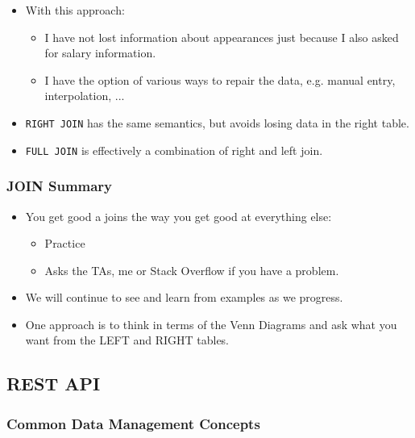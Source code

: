 \documentclass[11pt]{article}
\providecommand{\tightlist}{%
      \setlength{\itemsep}{0pt}\setlength{\parskip}{0pt}}
\begin{document}
    \begin{itemize}
\item
  With this approach:

  \begin{itemize}
  \tightlist
  \item
    I have not lost information about appearances just because I also
    asked for salary information.
  \item
    I have the option of various ways to repair the data, e.g. manual
    entry, interpolation, ...
  \end{itemize}
\item
  \texttt{RIGHT\ JOIN} has the same semantics, but avoids losing data in
  the right table.
\item
  \texttt{FULL\ JOIN} is effectively a combination of right and left
  join.
\end{itemize}

    \subsubsection{JOIN Summary}\label{join-summary}

\begin{itemize}
\item
  You get good a joins the way you get good at everything else:

  \begin{itemize}
  \tightlist
  \item
    Practice
  \item
    Asks the TAs, me or Stack Overflow if you have a problem.
  \end{itemize}
\item
  We will continue to see and learn from examples as we progress.
\item
  One approach is to think in terms of the Venn Diagrams and ask what
  you want from the LEFT and RIGHT tables.
\end{itemize}

    \subsection{REST API}\label{rest-api}

\subsubsection{Common Data Management
Concepts}\label{common-data-management-concepts}
\end{document}
